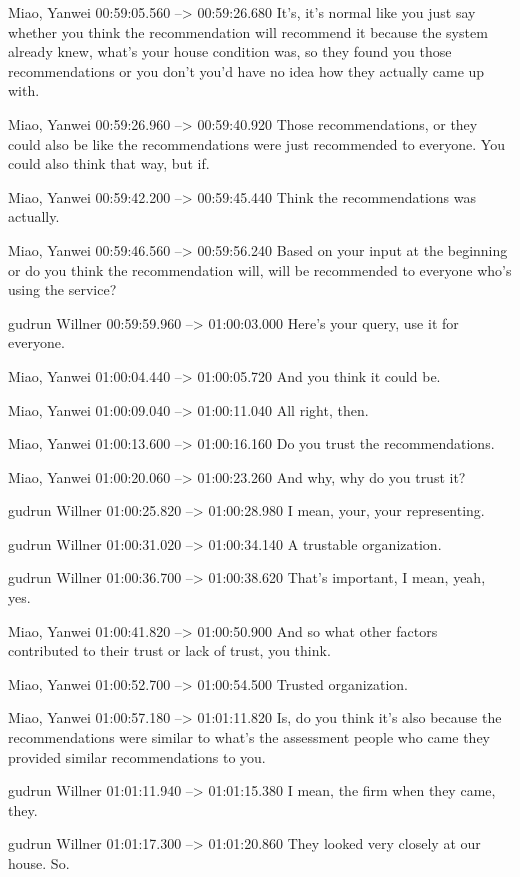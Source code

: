 {Miao, Yanwei 00:59:05.560 --> 00:59:26.680
It's, it's normal like you just say whether you think the recommendation will recommend it because the system already knew, what's your house condition was, so they found you those recommendations or you don't you'd have no idea how they actually came up with.

Miao, Yanwei 00:59:26.960 --> 00:59:40.920
Those recommendations, or they could also be like the recommendations were just recommended to everyone. You could also think that way, but if.

Miao, Yanwei 00:59:42.200 --> 00:59:45.440
Think the recommendations was actually.

Miao, Yanwei 00:59:46.560 --> 00:59:56.240
Based on your input at the beginning or do you think the recommendation will, will be recommended to everyone who's using the service?

gudrun Willner 00:59:59.960 --> 01:00:03.000
Here's your query, use it for everyone.

Miao, Yanwei 01:00:04.440 --> 01:00:05.720
And you think it could be.

Miao, Yanwei 01:00:09.040 --> 01:00:11.040
All right, then.

Miao, Yanwei 01:00:13.600 --> 01:00:16.160
Do you trust the recommendations.

Miao, Yanwei 01:00:20.060 --> 01:00:23.260
And why, why do you trust it?

gudrun Willner 01:00:25.820 --> 01:00:28.980
I mean, your, your representing.

gudrun Willner 01:00:31.020 --> 01:00:34.140
A trustable organization.

gudrun Willner 01:00:36.700 --> 01:00:38.620
That's important, I mean, yeah, yes.

Miao, Yanwei 01:00:41.820 --> 01:00:50.900
And so what other factors contributed to their trust or lack of trust, you think.

Miao, Yanwei 01:00:52.700 --> 01:00:54.500
Trusted organization.

Miao, Yanwei 01:00:57.180 --> 01:01:11.820
Is, do you think it's also because the recommendations were similar to what's the assessment people who came they provided similar recommendations to you.

gudrun Willner 01:01:11.940 --> 01:01:15.380
I mean, the firm when they came, they.

gudrun Willner 01:01:17.300 --> 01:01:20.860
They looked very closely at our house. So.

}
